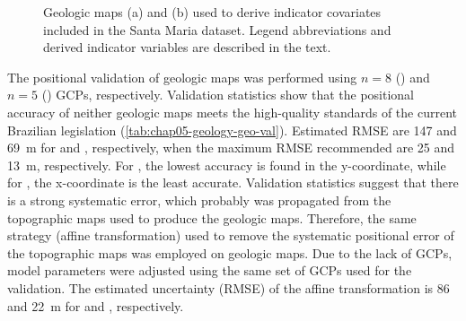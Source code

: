 \begin{figure}[!ht]
\begin{minipage}[b]{0.45\textwidth}
\end{minipage} 
\caption[Geologic maps included in the Santa Maria dataset.]{Geologic maps (a) \geoOld{} and (b) \geoNew{} 
used to derive indicator covariates included in the Santa Maria dataset. Legend abbreviations and derived 
indicator variables are described in the text.}
\label{fig:chap05-geo-maps}
\end{figure}

The positional validation of geologic maps was performed using $n = 8$ (\geoOld{}) and $n = 5$ (\geoNew{}) 
GCPs, respectively. Validation statistics show that the positional accuracy of neither geologic maps meets the 
high-quality standards of the current Brazilian legislation (\autoref{tab:chap05-geology-geo-val}). Estimated 
RMSE are \num{147} and \SI{69}{\m} for \geoOld{} and \geoNew{}, respectively, when the maximum RMSE 
recommended are \num{25} and \SI{13}{\m}, respectively. For \geoOld{}, the lowest accuracy is found in the 
y-coordinate, while for \geoNew{}, the x-coordinate is the least accurate. Validation statistics suggest that 
there is a strong systematic error, which probably was propagated from the topographic maps used to produce 
the geologic maps. Therefore, the same strategy (affine transformation) used to remove the systematic 
positional error of the topographic maps was employed on geologic maps. Due to the lack of GCPs, model 
parameters were adjusted using the same set of GCPs used for the validation. The estimated uncertainty (RMSE) 
of the affine transformation is \num{86} and \SI{22}{\m} for \geoOld{} and \geoNew{}, respectively.


